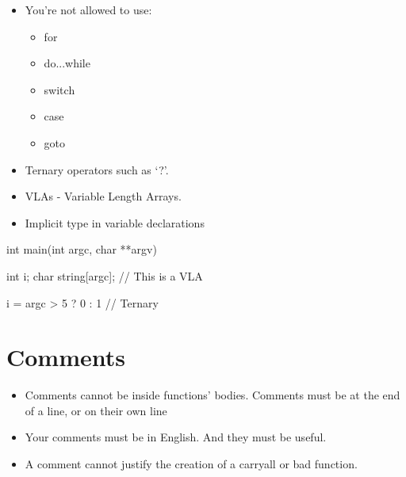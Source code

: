 \documentclass{42-ko}
\begin{document}
        \begin{itemize}

            \item You're not allowed to use:

                \begin{itemize}

                    \item for
                    \item do...while
                    \item switch
                    \item case
                    \item goto

                \end{itemize}

            \item Ternary operators such as `?'.

            \item VLAs - Variable Length Arrays.

            \item Implicit type in variable declarations

        \end{itemize}
        \begin{42ccode}
    int main(int argc, char **argv)
    {
        int     i;
        char    string[argc]; // This is a VLA

        i = argc > 5 ? 0 : 1 // Ternary
    }
        \end{42ccode}
        \newpage

    \section{Comments}

        \begin{itemize}

            \item Comments cannot be inside functions' bodies.
                Comments must be at the end of a line, or on their own line

            \item Your comments must be in English. And they must be
                useful.

            \item  A comment cannot justify the creation of a carryall or bad function.

        \end{itemize}
\end{document}

